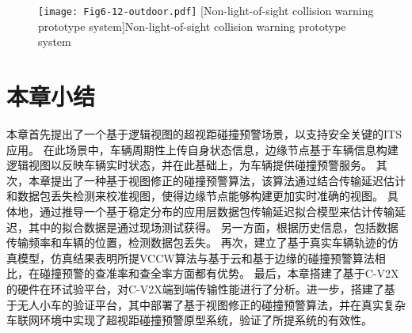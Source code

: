 \begin{figure}[h]
\centering
  \texttt{[image: Fig6-12-outdoor.pdf]}
  [Non-light-of-sight collision warning prototype system]{Non-light-of-sight collision warning prototype system}
  \label{fig 6-12}
\end{figure}


\section{本章小结}\label{section 6-6}

本章首先提出了一个基于逻辑视图的超视距碰撞预警场景，以支持安全关键的ITS应用。
在此场景中，车辆周期性上传自身状态信息，边缘节点基于车辆信息构建逻辑视图以反映车辆实时状态，并在此基础上，为车辆提供碰撞预警服务。
其次，本章提出了一种基于视图修正的碰撞预警算法，该算法通过结合传输延迟估计和数据包丢失检测来校准视图，使得边缘节点能够构建更加实时准确的视图。
具体地，通过推导一个基于稳定分布的应用层数据包传输延迟拟合模型来估计传输延迟，其中的拟合数据是通过现场测试获得。
另一方面，根据历史信息，包括数据传输频率和车辆的位置，检测数据包丢失。
再次，建立了基于真实车辆轨迹的仿真模型，仿真结果表明所提VCCW算法与基于云和基于边缘的碰撞预警算法相比，在碰撞预警的查准率和查全率方面都有优势。
最后，本章搭建了基于C-V2X的硬件在环试验平台，对C-V2X端到端传输性能进行了分析。进一步，搭建了基于无人小车的验证平台，其中部署了基于视图修正的碰撞预警算法，并在真实复杂车联网环境中实现了超视距碰撞预警原型系统，验证了所提系统的有效性。